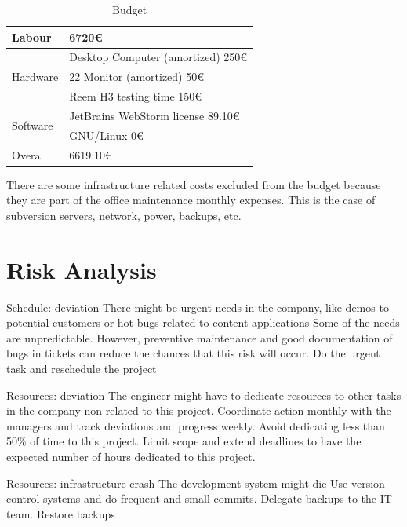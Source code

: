 \begin{table}[ht]
    \centering
    \begin{tabular}{| l | l |}
    \hline
    Labour & 6720\euro{} \\ \hline
    \multirow{3}{*}{Hardware} 
        & Desktop Computer (amortized) 250\euro{} \\ %
        & 22 Monitor (amortized) 50\euro{} \\
        & Reem H3 testing time 150\euro{} \\ \hline   
    \multirow{2}{*}{Software}
        & JetBrains WebStorm license 89.10\euro{} \\ %
        & GNU/Linux 0\euro{} \\ \hline
     Overall & 6619.10\euro{} \\ 
     \hline
    \end{tabular}
    \caption{Budget}
    \label{tab:budget}
\end{table}

There are some infrastructure related costs excluded from the budget because they are part of the office maintenance monthly expenses.
This is the case of subversion servers, network, power, backups, etc. 

\section{Risk Analysis}
\label{sec:risk}
\begin{risk}
{Schedule: deviation}
{There might be urgent needs in the company, like demos to potential customers or hot bugs related to content applications}
{Some of the needs are unpredictable. However, preventive maintenance and good documentation of bugs in tickets can reduce the chances that this risk will occur.}
{Do the urgent task and reschedule the project}
\end{risk}

\begin{risk}
{Resources: deviation}
{The engineer might have to dedicate resources to other tasks in the company non-related to this project.}
{Coordinate action monthly with the managers and track deviations and progress weekly. Avoid dedicating less than 50\% of time to this project.}
{Limit scope and extend deadlines to have the expected number of hours dedicated to this project.}
\end{risk}

\begin{risk}
{Resources: infrastructure crash}
{The development system might die}
{Use version control systems and do frequent and small commits. Delegate backups to the IT team.}
{Restore backups}
\end{risk}

